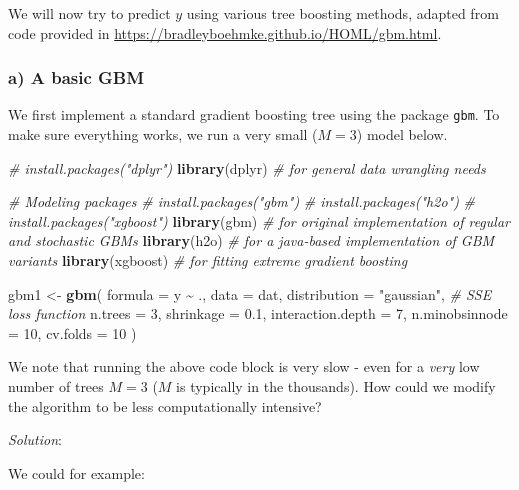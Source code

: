 \documentclass[
]{article}
\newenvironment{Shaded}{\begin{snugshade}}{\end{snugshade}}
\newcommand{\AttributeTok}[1]{\textcolor[rgb]{0.13,0.29,0.53}{#1}}
\newcommand{\CommentTok}[1]{\textcolor[rgb]{0.56,0.35,0.01}{\textit{#1}}}
\newcommand{\DecValTok}[1]{\textcolor[rgb]{0.00,0.00,0.81}{#1}}
\newcommand{\FloatTok}[1]{\textcolor[rgb]{0.00,0.00,0.81}{#1}}
\newcommand{\FunctionTok}[1]{\textcolor[rgb]{0.13,0.29,0.53}{\textbf{#1}}}
\newcommand{\NormalTok}[1]{#1}
\newcommand{\OtherTok}[1]{\textcolor[rgb]{0.56,0.35,0.01}{#1}}
\newcommand{\SpecialCharTok}[1]{\textcolor[rgb]{0.81,0.36,0.00}{\textbf{#1}}}
\newcommand{\StringTok}[1]{\textcolor[rgb]{0.31,0.60,0.02}{#1}}
\begin{document}
We will now try to predict \(y\) using various tree boosting methods,
adapted from code provided in
\url{https://bradleyboehmke.github.io/HOML/gbm.html}.

\hypertarget{a-a-basic-gbm}{%
\subsubsection{a) A basic GBM}\label{a-a-basic-gbm}}

We first implement a standard gradient boosting tree using the package
\texttt{gbm}. To make sure everything works, we run a very small
(\(M=3\)) model below.

\begin{Shaded}
\begin{Highlighting}[]
\CommentTok{\# install.packages("dplyr")}
\FunctionTok{library}\NormalTok{(dplyr)    }\CommentTok{\# for general data wrangling needs}

\CommentTok{\# Modeling packages}
\CommentTok{\# install.packages("gbm")}
\CommentTok{\# install.packages("h2o")}
\CommentTok{\# install.packages("xgboost")}
\FunctionTok{library}\NormalTok{(gbm)      }\CommentTok{\# for original implementation of regular and stochastic GBMs}
\FunctionTok{library}\NormalTok{(h2o)      }\CommentTok{\# for a java{-}based implementation of GBM variants}
\FunctionTok{library}\NormalTok{(xgboost)  }\CommentTok{\# for fitting extreme gradient boosting}

\NormalTok{gbm1 }\OtherTok{\textless{}{-}} \FunctionTok{gbm}\NormalTok{(}
  \AttributeTok{formula =}\NormalTok{ y }\SpecialCharTok{\textasciitilde{}}\NormalTok{ .,}
  \AttributeTok{data =}\NormalTok{ dat,}
  \AttributeTok{distribution =} \StringTok{"gaussian"}\NormalTok{,  }\CommentTok{\# SSE loss function}
  \AttributeTok{n.trees =} \DecValTok{3}\NormalTok{,}
  \AttributeTok{shrinkage =} \FloatTok{0.1}\NormalTok{,}
  \AttributeTok{interaction.depth =} \DecValTok{7}\NormalTok{,}
  \AttributeTok{n.minobsinnode =} \DecValTok{10}\NormalTok{,}
  \AttributeTok{cv.folds =} \DecValTok{10}
\NormalTok{)}
\end{Highlighting}
\end{Shaded}

We note that running the above code block is very slow - even for a
\emph{very} low number of trees \(M=3\) (\(M\) is typically in the
thousands). How could we modify the algorithm to be less computationally
intensive?

\emph{Solution}:

We could for example:
\end{document}
